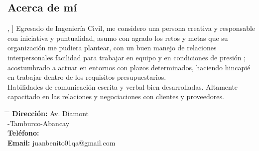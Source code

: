 \documentclass[a4paper,11pt]{article}
\begin{document}
\begin{multicols}{2}[\columnsep=0.4cm]
\begin{center}
\begin{minipage}{0.4\textwidth}
\begin{tcolorbox}
\begin{center}
							\section*{Acerca de mí}
						\end{center}, %
						]				
						Egresado de Ingeniería Civil, me considero una persona creativa y responsable con iniciativa y puntualidad, asumo con agrado los retos y metas que su organización me pudiera plantear, con un buen manejo de relaciones interpersonales facilidad para trabajar en equipo y en condiciones de presión ; acostumbrado a actuar en entornos con plazos determinados, haciendo hincapié en trabajar dentro de los requisitos presupuestarios.\\
						Habilidades de comunicación escrita y verbal bien desarrolladas.
						Altamente capacitado en las relaciones y negociaciones con clientes y proveedores.	
					\end{tcolorbox}
					
				\end{minipage}
			\end{center}

\vspace{5mm}	
	
		\begin{center}
			\begin{minipage}{0.41\textwidth}
				
				\begin{tcolorbox}[
					enhanced,
					boxrule=2pt,
					colframe=darkblue,
					colback=darkblue!10,
					width=\linewidth,
					sharp corners,
					halign=center,  %
					valign=center,
					title=\begin{center}
						\section*{Contacto}
					\end{center}, %
					]				
					\begin{tabbing}
						\hspace{1.8cm} \= \hspace{4cm} \= \kill %
						\textbf{Dirección:} \> Av. Diamont \\
						\> -Tamburco-Abancay \> \\
						\textbf{\faPhoneSquare Teléfono:}  \> 988757518 \> \\
						\textbf{\faEnvelope Email:} \> juanbenito01qa@gmail.com \> \\
					\end{tabbing}	
				\end{tcolorbox}
				

\end{minipage}
\end{center}
\end{multicols}
\end{document}
